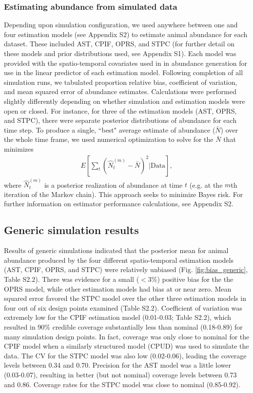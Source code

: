 \documentclass[times,mee,doublespace,]{besauth2}
\begin{document}
\subsubsection{Estimating abundance from simulated data}

Depending upon simulation configuration, we used anywhere between one and four estimation models (see Appendix S2) to estimate animal abundance for each dataset.  These included AST, CPIF, OPRS, and STPC (for further detail on these models and prior distributions used, see Appendix S1).  Each model was provided with the spatio-temporal covariates used in in abundance generation for use in the linear predictor of each estimation model.  Following completion of all simulation runs, we tabulated proportion relative bias, coefficient of variation, and mean squared error of abundance estimates.  Calculations were performed slightly differently depending on whether simulation and estimation models were open or closed.  For instance, for three of the estimation models (AST, OPRS, and STPC), there were separate posterior distributions of abundance for each time step.  To produce a single, ``best" average estimate of abundance ($\bar{N}$) over the whole time frame,
we used numerical optimization to solve for the $\bar{N}$ that minimizes
\begin{eqnarray*}
  E \left[ \sum_t (\hat{N}_t^{(m)} - \bar{N})^2 | \text{Data} \right],
\end{eqnarray*}
where $\hat{N}_t^{(m)}$ is a posterior realization of abundance at time $t$ (e.g. at the $m$th iteration of the Markov chain).  This approach seeks to minimize Bayes risk.  For further information on estimator performance calculations, see Appendix S2.

\subsection{Generic simulation results}

Results of generic simulations indicated that the posterior mean for animal abundance produced by the four different spatio-temporal estimation models (AST, CPIF, OPRS, and STPC) were relatively unbiased (Fig. \ref{fig:bias_generic}, Table S2.2).  There was evidence for a small ($<3\%$)  positive bias for the the OPRS model, while other estimation models had bias at or near zero.  Mean squared error favored the STPC model over the other three estimation models in four out of six design points examined (Table S2.2).  Coefficient of variation was extremely low for the CPIF estimation model (0.01-0.03; Table S2.2), which resulted in 90\% credible coverage substantially less than nominal (0.18-0.89) for many simulation design points.  In fact, coverage was only close to nominal for the CPIF model when a similarly structured model (CPUD) was used to simulate the data.  The CV for the STPC model was also low (0.02-0.06), leading the coverage levels between 0.34 and 0.70.  Precision for the AST model was a little lower (0.03-0.07), resulting in better (but not nominal) coverage levels between 0.73 and 0.86.  Coverage rates for the STPC model was close to nominal (0.85-0.92).
\end{document}
